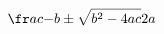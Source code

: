 \documentclass[preview]{standalone}
\begin{document}
\begin{align*}
\fr a c { - b   \pm   \sqrt{ b ^ 2   -   4 a c }}{ 2 a }
\end{align*}
\end{document}

